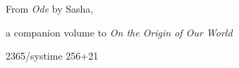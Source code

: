 \documentclass[10pt]{memoir}
\begin{document}
  From \emph{Ode} by Sasha,

  a companion volume to \emph{On the Origin of Our World}

  2365/systime 256+21
  
  \vfill



%  

  \backmatter

  \markboth{}{}
\end{document}
